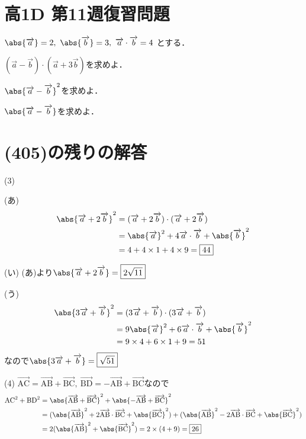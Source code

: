 \documentclass[dvipdfmx,uplatex,b5paper]{jsarticle}
\newcommand{\Vector}[1]{\overrightarrow{\text{#1}}}
\begin{document}
\section*{高1D 第11週復習問題}
$\abs{\overrightarrow{a}}=2,\ \abs{\overrightarrow{b}}=3,\ \overrightarrow{a}\cdot \overrightarrow{b}=4$
とする．
\begin{enumarabicp}
  \item $(\overrightarrow{a}-\overrightarrow{b})\cdot (\overrightarrow{a}+3\overrightarrow{b})$を求めよ．
  \item $\abs{\overrightarrow{a}-\overrightarrow{b}}^2$を求めよ．
  \item $\abs{\overrightarrow{a}-\overrightarrow{b}}$を求めよ．
\end{enumarabicp}

\newpage
\section*{(405)の残りの解答}
\begin{enumarabicp}
  \item[(3)] 
  \begin{enumarabicp}
    \item[(あ)] 
      \begin{align*}
        \abs{\overrightarrow{a}+2\overrightarrow{b}}^2&=(\overrightarrow{a}+2\overrightarrow{b})\cdot (\overrightarrow{a}+2\overrightarrow{b}) \\
        &=\abs{\overrightarrow{a}}^2+4\overrightarrow{a}\cdot \overrightarrow{b}+\abs{\overrightarrow{b}}^2 \\
        &=4+4\times 1+4\times 9= \boxed{44}
      \end{align*} 
    \item[(い)] (あ)より$\abs{\overrightarrow{a}+2\overrightarrow{b}}=\boxed{2\sqrt{11}}$
    \vspace{1mm}
    \item[(う)]
      \begin{align*}
        \abs{3\overrightarrow{a}+\overrightarrow{b}}^2&=(3\overrightarrow{a}+\overrightarrow{b})\cdot (3\overrightarrow{a}+\overrightarrow{b}) \\
        &=9\abs{\overrightarrow{a}}^2+6\overrightarrow{a}\cdot \overrightarrow{b}+\abs{\overrightarrow{b}}^2 \\
        &=9\times 4+6\times 1+9=51
      \end{align*}  
    なので$\abs{3\overrightarrow{a}+\overrightarrow{b}}=\boxed{\sqrt{51}}$
  \end{enumarabicp} 
  \vspace{3mm}
  \item[(4)] $\Vector{AC}=\Vector{AB}+\Vector{BC},\ \Vector{BD}=-\Vector{AB}+\Vector{BC}$なので
    \begin{align*}
      \text{AC}^2+\text{BD}^2&=\abs{\Vector{AB}+\Vector{BC}}^2+\abs{-\Vector{AB}+\Vector{BC}}^2 \\
      &=(\abs{\Vector{AB}}^2+2\Vector{AB}\cdot\Vector{BC}+\abs{\Vector{BC}}^2)+(\abs{\Vector{AB}}^2-2\Vector{AB}\cdot\Vector{BC}+\abs{\Vector{BC}}^2) \\
      &=2(\abs{\Vector{AB}}^2+\abs{\Vector{BC}}^2)=2\times (4+9)=\boxed{26}
    \end{align*} 
\end{enumarabicp}
\end{document}
